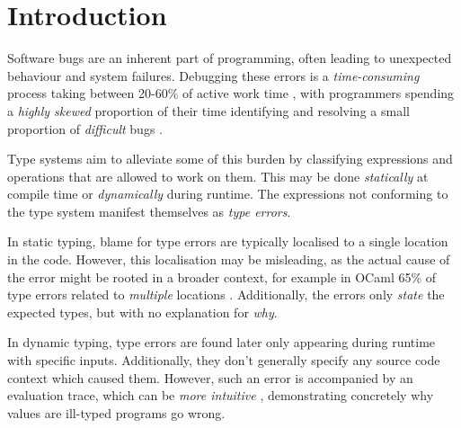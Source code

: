 \chapter{Introduction}
\label{chap:Introduction}
Software bugs are an inherent part of programming, often leading to unexpected behaviour and system failures. Debugging these errors is a \textit{time-consuming} process taking between 20-60\% of active work time \cite{DebugTimeSelfReport}, with programmers spending a \textit{highly skewed} proportion of their time identifying and resolving a small proportion of \textit{difficult} bugs \cite{DebugSkew}.

Type systems aim to alleviate some of this burden by classifying expressions and operations that are allowed to work on them. This may be done \textit{statically} at compile time or \textit{dynamically} during runtime. The expressions not conforming to the type system manifest themselves as \textit{type errors}.

In static typing, blame for type errors are typically localised to a single location in the code. However, this localisation may be misleading, as the actual cause of the error might be rooted in a broader context, for example in OCaml 65\% of type errors related to \textit{multiple} locations \cite{StudentTypeErrorFixes}. Additionally, the errors only \textit{state} the expected types, but with no explanation for \textit{why}.

In dynamic typing, type errors are found later only appearing during runtime with specific inputs.
Additionally, they don't generally specify any source code context which caused them. However, such an error is accompanied by an evaluation trace, which can be \textit{more intuitive} \cite{TraceVisualisation}, demonstrating concretely why values are ill-typed programs go wrong.


